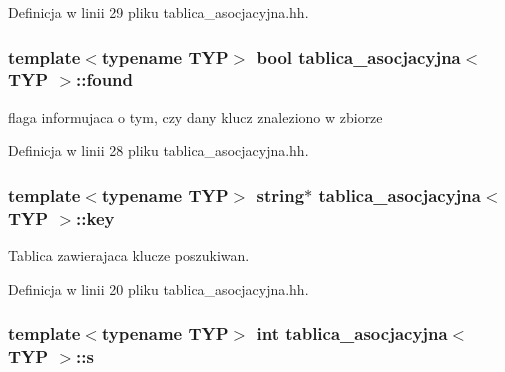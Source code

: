 \-Definicja w linii 29 pliku tablica\-\_\-asocjacyjna.\-hh.

\hypertarget{classtablica__asocjacyjna_aa3423d398d1a6b96e3f42398a2ce5a1e}{
\subsubsection[{found}]{\setlength{\rightskip}{0pt plus 5cm}template$<$typename \-T\-Y\-P$>$ bool {\bf tablica\-\_\-asocjacyjna}$<$ \-T\-Y\-P $>$\-::{\bf found}}}\label{classtablica__asocjacyjna_aa3423d398d1a6b96e3f42398a2ce5a1e}


flaga informujaca o tym, czy dany klucz znaleziono w zbiorze 



\-Definicja w linii 28 pliku tablica\-\_\-asocjacyjna.\-hh.

\hypertarget{classtablica__asocjacyjna_aefde9ad3347d42f36cab258144bacc1f}{
\subsubsection[{key}]{\setlength{\rightskip}{0pt plus 5cm}template$<$typename \-T\-Y\-P$>$ string$\ast$ {\bf tablica\-\_\-asocjacyjna}$<$ \-T\-Y\-P $>$\-::{\bf key}}}\label{classtablica__asocjacyjna_aefde9ad3347d42f36cab258144bacc1f}


\-Tablica zawierajaca klucze poszukiwan. 



\-Definicja w linii 20 pliku tablica\-\_\-asocjacyjna.\-hh.

\hypertarget{classtablica__asocjacyjna_a4a9d8aa0a03fd1ccf2fa7980d61bc197}{
\subsubsection[{s}]{\setlength{\rightskip}{0pt plus 5cm}template$<$typename \-T\-Y\-P$>$ int {\bf tablica\-\_\-asocjacyjna}$<$ \-T\-Y\-P $>$\-::{\bf s}}}\label{classtablica__asocjacyjna_a4a9d8aa0a03fd1ccf2fa7980d61bc197}


